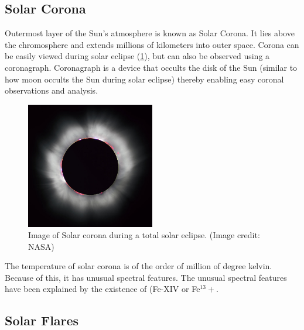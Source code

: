 \subsection{Solar Corona}

Outermost layer of the Sun's atmosphere is known as Solar Corona. It lies above the chromosphere and extends millions of kilometers into outer space. Corona can be easily viewed during solar eclipse (\cref{fig:corona_eclipse}), but can also be observed using a coronagraph. Coronagraph is a device that occults the disk of the Sun (similar to how moon occults the Sun during solar eclipse) thereby enabling easy coronal observations and analysis.

\begin{figure}[h!]
    \centering
    \includegraphics[width=0.5\textwidth]{images/corona.jpg}
    \caption[Image of Solar corona during a total solar eclipse]{Image of Solar corona during a total solar eclipse. (Image credit: NASA)}
    \label{fig:corona_eclipse}
\end{figure}

The temperature of solar corona is of the order of million of degree kelvin. Because of this, it has unusual spectral features. The unusual spectral features have been explained by the existence of (Fe-XIV or Fe$^{13}+$. \citep{aschwanden2006physics}

\subsection{Solar Flares}

